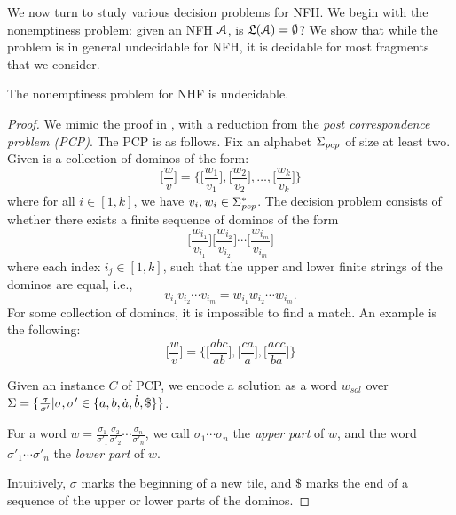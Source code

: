 We now turn to study various decision problems for NFH. We begin with the nonemptiness problem: given an NFH $\mathcal{A}$, is $\mathfrak{L}(\mathcal{A}) = \emptyset$? We show that while the problem is in general undecidable for NFH, it is decidable for most fragments that we consider. 


\begin{theorem}
The nonemptiness problem for NHF is undecidable.
\end{theorem}

\begin{proof}

We mimic the proof in \cite{fh16}, with a reduction from the {\em post correspondence problem (PCP)}.
%
The PCP is as follows.
%
Fix an alphabet $\Sigma_{\mathit{pcp}}$ of size at least two. 
%
Given is a collection of dominos of the form:
$$\Big[\frac{w}{v} \Big] = \bigg\{\Big[\frac{w_1}{v_1} \Big], 
\Big[\frac{w_2}{v_2} \Big],\dots, \Big[\frac{w_k}{v_k} \Big] \bigg\}$$
where for all $i \in [1, k]$, we have $v_i,w_i \in \Sigma_{\mathit{pcp}}^*$.
%
The decision problem consists of whether there exists a finite sequence of
dominos of the form
$$\Big[\frac{w_{i_1}}{v_{i_1}} \Big]\Big[\frac{w_{i_2}}{v_{i_2}} \Big] \cdots 
\Big[\frac{w_{i_m}}{v_{i_m}} \Big]$$
where each index $i_j \in [1, k]$, such that the upper and lower finite strings 
of the dominos are equal, i.e.,
$$v_{i_1}v_{i_2}\cdots{}v_{i_m} = w_{i_1}w_{i_2}\cdots{}w_{i_m}.$$
%
For some collection of dominos, it is impossible to find a match. An example is 
the following:
$$\Big[\frac{w}{v} \Big] = \bigg\{\Big[\frac{abc}{ab} \Big], \Big[\frac{ca}{a} 
\Big], \Big[\frac{acc}{ba} \Big]\bigg\}$$


Given an instance $C$ of PCP, we encode a solution as a word $w_{sol}$ over $\Sigma = \{\frac{\sigma}{\sigma'}| \sigma,\sigma'\in\{a,b,{\dot a},{\dot b}, \$\}\}$.

For a word $w = \frac{\sigma_1}{\sigma'_1}   \frac{\sigma_2}{\sigma'_2}  \cdots  \frac{\sigma_n}{\sigma'_n}  $, we call $\sigma_1\cdots \sigma_n$ the {\em upper part} of $w$, and the word $\sigma'_1\cdots \sigma'_n$ the {\em lower part} of $w$. 

Intuitively, $\dot{\sigma}$ marks the beginning of a new tile, and $\$$ marks the end of a sequence of the upper or lower parts of the dominos.


\end{proof}
